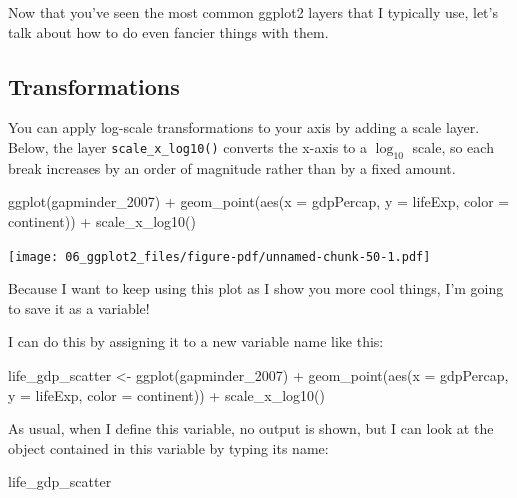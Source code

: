 \documentclass[
  letterpaper,
  DIV=11,
  numbers=noendperiod]{scrreprt}
\newenvironment{Shaded}{\begin{snugshade}}{\end{snugshade}}
\newcommand{\AttributeTok}[1]{\textcolor[rgb]{0.40,0.45,0.13}{#1}}
\newcommand{\FunctionTok}[1]{\textcolor[rgb]{0.28,0.35,0.67}{#1}}
\newcommand{\NormalTok}[1]{\textcolor[rgb]{0.00,0.23,0.31}{#1}}
\newcommand{\OtherTok}[1]{\textcolor[rgb]{0.00,0.23,0.31}{#1}}
\newcommand{\SpecialCharTok}[1]{\textcolor[rgb]{0.37,0.37,0.37}{#1}}
\begin{document}
Now that you've seen the most common ggplot2 layers that I typically
use, let's talk about how to do even fancier things with them.

\subsection{Transformations}\label{transformations}

You can apply log-scale transformations to your axis by adding a scale
layer. Below, the layer \texttt{scale\_x\_log10()} converts the x-axis
to a \(\log_{10}\) scale, so each break increases by an order of
magnitude rather than by a fixed amount.

\begin{Shaded}
\begin{Highlighting}[]
\FunctionTok{ggplot}\NormalTok{(gapminder\_2007) }\SpecialCharTok{+} 
  \FunctionTok{geom\_point}\NormalTok{(}\FunctionTok{aes}\NormalTok{(}\AttributeTok{x =}\NormalTok{ gdpPercap, }
                 \AttributeTok{y =}\NormalTok{ lifeExp, }
                 \AttributeTok{color =}\NormalTok{ continent)) }\SpecialCharTok{+} 
  \FunctionTok{scale\_x\_log10}\NormalTok{()}
\end{Highlighting}
\end{Shaded}

\texttt{[image: 06\_ggplot2\_files/figure-pdf/unnamed-chunk-50-1.pdf]}

Because I want to keep using this plot as I show you more cool things,
I'm going to save it as a variable!

I can do this by assigning it to a new variable name like this:

\begin{Shaded}
\begin{Highlighting}[]
\NormalTok{life\_gdp\_scatter }\OtherTok{\textless{}{-}} \FunctionTok{ggplot}\NormalTok{(gapminder\_2007) }\SpecialCharTok{+} 
  \FunctionTok{geom\_point}\NormalTok{(}\FunctionTok{aes}\NormalTok{(}\AttributeTok{x =}\NormalTok{ gdpPercap, }
                 \AttributeTok{y =}\NormalTok{ lifeExp, }
                 \AttributeTok{color =}\NormalTok{ continent)) }\SpecialCharTok{+} 
  \FunctionTok{scale\_x\_log10}\NormalTok{()}
\end{Highlighting}
\end{Shaded}

As usual, when I define this variable, no output is shown, but I can
look at the object contained in this variable by typing its name:

\begin{Shaded}
\begin{Highlighting}[]
\NormalTok{life\_gdp\_scatter}
\end{Highlighting}
\end{Shaded}
\end{document}

